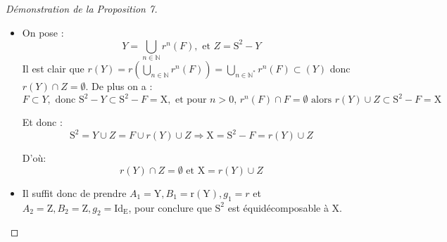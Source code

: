 \begin{proof}[Démonstration de la Proposition 7]
  \hfill
  \begin{itemize}
    \item   On pose : $$Y = \underset{n\in \mathbb{N}}{\bigcup}r^n(F), \text{ et } Z = \mathrm{S}^2-Y$$
      Il est clair que $r(Y) = r(\underset{n\in \mathbb{N}}{\bigcup}r^n(F))=\underset{n\in \mathbb{N}^*}{\bigcup}r^n(F) \subset(Y)$ donc $r(Y) \cap Z = \emptyset$. De plus on a :
      $$F \subset Y, \text{ donc } \mathrm{S}^2-Y \subset \mathrm{S}^2-F=\mathrm{X}, \text{ et pour $n>0$, } r^n(F) \cap F = \emptyset \text{ alors } r(Y) \cup Z \subset \mathrm{S}^2-F=\mathrm{X}$$\par
      Et donc : $$ \mathrm{S}^2=Y\cup Z =F\cup r(Y) \cup Z \Rightarrow \mathrm{X}=\mathrm{S}^2-F = r(Y)\cup Z$$\par D'où:
      $$r(Y) \cap Z = \emptyset \text{ et }\mathrm{X}= r(Y)\cup Z$$
    \item  Il suffit donc de prendre $A_1=\mathrm{Y}, B_1=\mathrm{r(Y)} , g_1=r$ et $A_2=\mathrm{Z}, B_2=\mathrm{Z} , g_2=\mathrm{Id_E}$, pour conclure que $\mathrm{S}^2$ est équidécomposable à $\mathrm{X}$.\par

  \end{itemize}
\end{proof}

